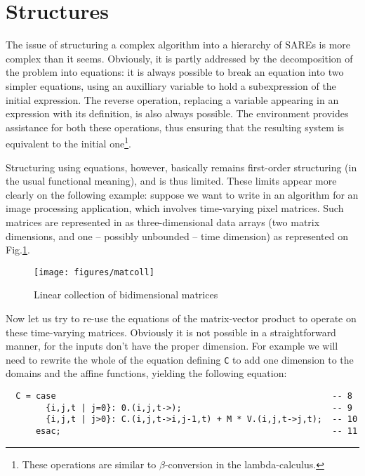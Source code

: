 \section{Structures\label{structures}}

The issue of structuring a complex algorithm into a hierarchy of SAREs
is more complex than it seems. Obviously, it is partly addressed by
the decomposition of the problem into equations: it is always possible
to break an equation into two simpler equations, using an auxilliary
variable to hold a subexpression of the initial expression. The
reverse operation, replacing a variable appearing in an expression
with its definition, is also always possible. The {\mmalfa}
environment provides assistance for both these operations, thus ensuring
that the resulting system is equivalent to the initial one\footnote{These
operations are similar to $\beta$-conversion in the
lambda-calculus.}.

Structuring using equations, however, basically remains first-order
structuring (in the usual functional meaning), and is thus
limited. These limits appear more clearly on the following example:
suppose we want to write in {\alfa} an algorithm for an
image processing application, which involves time-varying pixel matrices.
Such matrices are represented in {\alfa} as three-dimensional data
arrays (two matrix dimensions, and one -- possibly unbounded -- time
dimension) as represented on Fig.\ref{CollectionLineaire}.
\begin{figure}[!t]
  \centerline{
    \texttt{[image: figures/matcoll]}
  }
\caption{Linear collection of bidimensional matrices
\label{CollectionLineaire}}
\end{figure}

Now let us try to re-use the equations of the matrix-vector product to
operate on these time-varying matrices. Obviously it is not possible
in a straightforward manner, for the inputs don't have the proper
dimension. For example we will need to rewrite the whole of the
equation defining \texttt{C} to add one dimension to the domains and
the affine functions, yielding the following equation:

\begin{verbatim}
  C = case                                                       -- 8  
        {i,j,t | j=0}: 0.(i,j,t->);                              -- 9  
        {i,j,t | j>0}: C.(i,j,t->i,j-1,t) + M * V.(i,j,t->j,t);  -- 10 
      esac;                                                      -- 11 
\end{verbatim}

